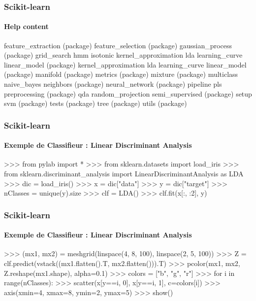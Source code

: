 \begin{frame}[fragile]
\frametitle{Scikit-learn}
\framesubtitle{Help content}
\begin{pythonConsole}
    feature_extraction (package)
    feature_selection (package)
    gaussian_process (package)
    grid_search
    hmm
    isotonic
    kernel_approximation
    lda
    learning_curve
    linear_model (package)
    kernel_approximation
    lda
    learning_curve
    linear_model (package)
    manifold (package)
    metrics (package)
    mixture (package)
    multiclass
    naive_bayes
    neighbors (package)
    neural_network (package)
    pipeline
    pls
    preprocessing (package)
    qda
    random_projection
    semi_supervised (package)
    setup
    svm (package)
    tests (package)
    tree (package)
    utils (package)
\end{pythonConsole}
\end{frame}
\begin{frame}[fragile]
\frametitle{Scikit-learn}
\framesubtitle{Exemple de Classifieur : Linear Discriminant Analysis}
\begin{pythonConsole}
>>> from pylab import *
>>> from sklearn.datasets import load_iris
>>> from sklearn.discriminant_analysis import LinearDiscriminantAnalysis as LDA
>>> dic = load_iris()
>>> x = dic["data"]
>>> y = dic["target"]
>>> nClasses = unique(y).size
>>> clf = LDA()
>>> clf.fit(x[:, :2], y)
\end{pythonConsole}
\end{frame}
\begin{frame}[fragile]
\frametitle{Scikit-learn}
\framesubtitle{Exemple de Classifieur : Linear Discriminant Analysis}
\begin{pythonConsole}
>>> (mx1, mx2) = meshgrid(linspace(4, 8, 100), linspace(2, 5, 100))
>>> Z = clf.predict(vstack((mx1.flatten().T, mx2.flatten())).T)
>>> pcolor(mx1, mx2, Z.reshape(mx1.shape), alpha=0.1)
>>> colors = ["b", "g", "r"]
>>> for i in range(nClasses): 
>>>   scatter(x[y==i, 0], x[y==i, 1], c=colors[i])
>>> axis(xmin=4, xmax=8, ymin=2, ymax=5)
>>> show()
\end{pythonConsole}
\end{frame}

